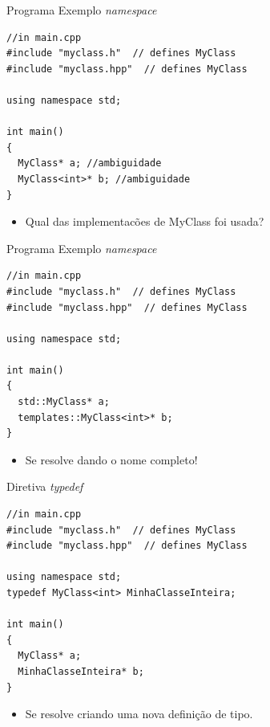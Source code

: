 \documentclass[12pt,table,xcolor={dvipsnames}]{beamer}
\begin{document}
\begin{frame}[fragile]{Programa Exemplo \textit{namespace}}
\begin{lstlisting}
//in main.cpp
#include "myclass.h"  // defines MyClass
#include "myclass.hpp"  // defines MyClass

using namespace std;

int main()
{
  MyClass* a; //ambiguidade
  MyClass<int>* b; //ambiguidade
}
\end{lstlisting}
\begin{itemize}
\item Qual das implementacões de MyClass foi usada?
\end{itemize}
\end{frame}

\begin{frame}[fragile]{Programa Exemplo \textit{namespace}}
\begin{lstlisting}
//in main.cpp
#include "myclass.h"  // defines MyClass
#include "myclass.hpp"  // defines MyClass

using namespace std;

int main()
{
  std::MyClass* a;
  templates::MyClass<int>* b;
}
\end{lstlisting}
\begin{itemize}
\item Se resolve dando o nome completo!
\end{itemize}
\end{frame}

\begin{frame}[fragile]{Diretiva \textit{typedef}}
\begin{lstlisting}
//in main.cpp
#include "myclass.h"  // defines MyClass
#include "myclass.hpp"  // defines MyClass

using namespace std;
typedef MyClass<int> MinhaClasseInteira;

int main()
{
  MyClass* a;
  MinhaClasseInteira* b;
}
\end{lstlisting}
\begin{itemize}
\item Se resolve criando uma nova definição de tipo.
\end{itemize}
\end{frame}
\end{document}
